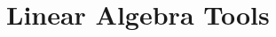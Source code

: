 \documentclass{article}
\begin{document}

\tableofcontents
\clearpage

\parindent 0pt

\section{Linear Algebra Tools}
\end{document}
